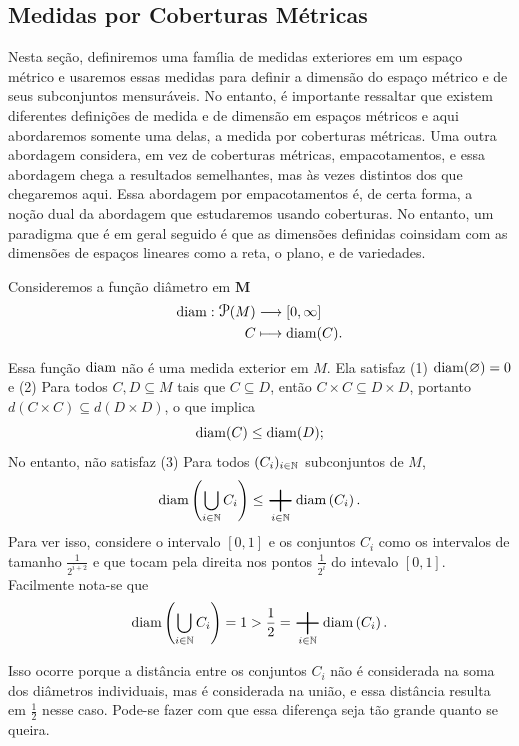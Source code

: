 \subsection{Medidas por Coberturas Métricas}

Nesta seção, definiremos uma família de medidas exteriores em um espaço métrico e usaremos essas medidas para definir a dimensão do espaço métrico e de seus subconjuntos mensuráveis. No entanto, é importante ressaltar que existem diferentes definições de medida e de dimensão em espaços métricos e aqui abordaremos somente uma delas, a medida por coberturas métricas. Uma outra abordagem considera, em vez de coberturas métricas, empacotamentos, e essa abordagem chega a resultados semelhantes, mas às vezes distintos dos que chegaremos aqui. Essa abordagem por empacotamentos é, de certa forma, a noção dual da abordagem que estudaremos usando coberturas. No entanto, um paradigma que é em geral seguido é que as dimensões definidas coinsidam com as dimensões de espaços lineares como a reta, o plano, e de variedades.

Consideremos a função diâmetro em $\bm M$
	\begin{align*}
	\func{\diam}{\p(M)}{[0,\infty]}{C}{\diam(C)}.
	\end{align*}

Essa função $\operatorname{diam}$ não é uma medida exterior em $M$. Ela satisfaz (1) $\operatorname{diam}(\varnothing)=0$ e (2) Para todos $C,D \subseteq M$ tais que $C \subseteq D$, então $C \times C \subseteq D \times D$, portanto $d(C \times C) \subseteq d(D \times D)$, o que implica
	\begin{equation*}
	\operatorname{diam}(C) \leq \operatorname{diam}(D);
	\end{equation*}
No entanto, não satisfaz 
(3) Para todos $(C_i)_{i \in \mathbb{N}}$ subconjuntos de $M$,
	\begin{equation*}
	\diam\left( \bigcup_{i \in \N} C_i \right) \leq \sum_{i \in \N} \diam\left( C_i \right).
	\end{equation*}
Para ver isso, considere o intervalo $[0,1]$ e os conjuntos $C_i$ como os intervalos de tamanho $\frac{1}{2^{i+2}}$ e que tocam pela direita nos pontos $\frac{1}{2^i}$ do intevalo $[0,1]$. Facilmente nota-se que
	\begin{equation*}
	\diam\left( \bigcup_{i \in \N} C_i \right) = 1 > \frac{1}{2} = \sum_{i \in \N} \diam\left( C_i \right).
	\end{equation*}

Isso ocorre porque a distância entre os conjuntos $C_i$ não é considerada na soma dos diâmetros individuais, mas é considerada na união, e essa distância resulta em $\frac{1}{2}$ nesse caso. Pode-se fazer com que essa diferença seja tão grande quanto se queira.

